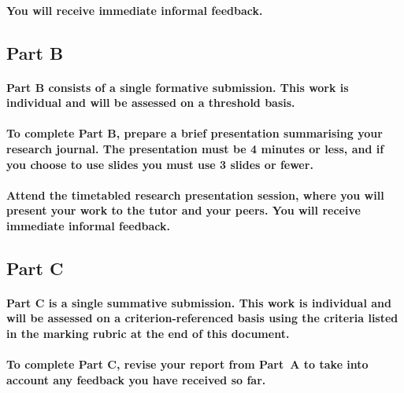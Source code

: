 \documentclass{../../fal_assignment}
\begin{document}
\paragraph{
You will receive \textbf{immediate informal feedback}.
}
 
\subsection*{Part B}

\paragraph{
Part B consists of a \textbf{single formative submission}. This work is \textbf{individual} and will be assessed on a \textbf{threshold} basis.
}

\paragraph{
To complete Part B, prepare a brief presentation summarising your research journal.
The presentation must be \textbf{4 minutes or less}, and if you choose to use slides you must use \textbf{3 slides or fewer}.
}

\paragraph{
Attend the timetabled research presentation session, where you will present your work to the tutor and your peers.
You will receive \textbf{immediate informal feedback}.
}

\subsection*{Part C}

\paragraph{
Part C is a \textbf{single summative submission}. This work is \textbf{individual} and will be assessed on a \textbf{criterion-referenced} basis
using the criteria listed in the marking rubric at the end of this document.
}

\paragraph{
To complete Part C, revise your report from Part~A to take into account any feedback you have received so far.
}
\end{document}
